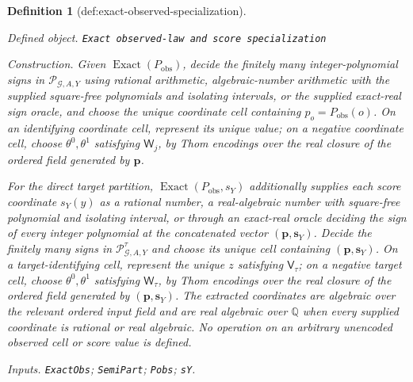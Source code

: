 \documentclass{article}
\newtheorem{definition}{Definition}
\begin{document}
\begin{definition}[def:exact-observed-specialization]\label{def:exact-observed-specialization}
\par\smallskip\noindent\emph{Defined object.} \texttt{Exact observed-\allowbreak{}law and score specialization}
\par\smallskip\noindent\emph{Construction.} Given \(\operatorname{Exact}(P_{\mathrm{obs}})\), decide the finitely many integer-polynomial signs in \(\mathscr P_{\mathcal G,A,Y}\) using rational arithmetic, algebraic-number arithmetic with the supplied square-free polynomials and isolating intervals, or the supplied exact-real sign oracle, and choose the unique coordinate cell containing \(p_o=P_{\mathrm{obs}}(o)\). On an identifying coordinate cell, represent its unique value; on a negative coordinate cell, choose \(\theta^0,\theta^1\) satisfying \(\mathsf W_j\), by Thom encodings over the real closure of the ordered field generated by \(\mathbf p\).

For the direct target partition, \(\operatorname{Exact}(P_{\mathrm{obs}},s_Y)\) additionally supplies each score coordinate \(s_Y(y)\) as a rational number, a real-algebraic number with square-free polynomial and isolating interval, or through an exact-real oracle deciding the sign of every integer polynomial at the concatenated vector \((\mathbf p,\mathbf s_Y)\). Decide the finitely many signs in \(\mathscr P^{\tau}_{\mathcal G,A,Y}\) and choose its unique cell containing \((\mathbf p,\mathbf s_Y)\). On a target-identifying cell, represent the unique \(z\) satisfying \(\mathsf V_{\tau}\); on a negative target cell, choose \(\theta^0,\theta^1\) satisfying \(\mathsf W_{\tau}\), by Thom encodings over the real closure of the ordered field generated by \((\mathbf p,\mathbf s_Y)\). The extracted coordinates are algebraic over the relevant ordered input field and are real algebraic over \(\mathbb Q\) when every supplied coordinate is rational or real algebraic. No operation on an arbitrary unencoded observed cell or score value is defined.
\par\smallskip\noindent\emph{Inputs.} \texttt{ExactObs}; \texttt{SemiPart}; \texttt{Pobs}; \texttt{sY}.
\end{definition}
\end{document}
